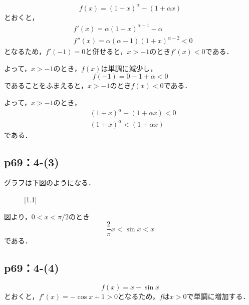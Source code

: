 \documentclass[uplatex,dvipdfmx,a4paper,10pt,fleqn]{jsarticle}
\begin{document}
\begin{tleftbar}
    \[
        f(x)=(1+x)^\alpha - (1+\alpha x)
    \]
    とおくと，
    \begin{align*} 
        &f'(x) = \alpha (1+x)^{\alpha -1} - \alpha \\
        & f''(x)= \alpha(\alpha-1) (1+x)^{\alpha -2} <0
    \end{align*} 
    となるため，$f'(-1)= 0$と併せると，$x>-1$のとき$f'(x) <0$である．

    よって，$ x>-1$のとき，$f(x)$は単調に減少し，
    \[
        f(-1)=0-1+\alpha <0
    \]
    であることをふまえると，$x>-1$のとき$f(x)<0$である．

    よって，$x>-1$のとき，
    \begin{align*} 
        & (1+x)^\alpha - (1+\alpha x)<0 \\
        & (1+x)^\alpha < (1+\alpha x)
    \end{align*} 
    である．
\end{tleftbar}


\subsection*{p69：4-(3)}


グラフは下図のようになる．
    \begin{figure}[htbp]
\scalebox{1.1}[1.1]{
 }
\end{figure}

図より，$0<x<\pi/2$のとき
\[
    \frac{2}{\pi} x < \sin x < x 
\]
である．


\subsection*{p69：4-(4)}

\[
    f(x)= x - \sin x
\]
とおくと，$f'(x)= -\cos x+1>0$となるため，$f$は$x>0$で単調に増加する．
\end{document}
